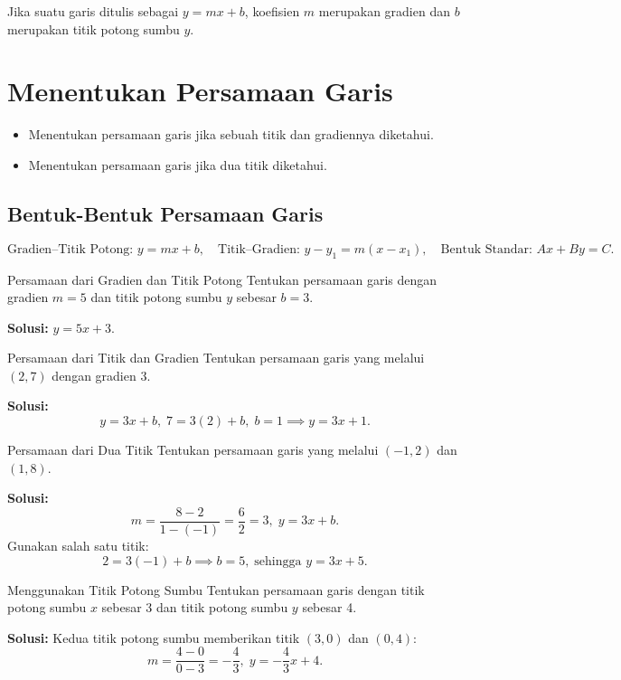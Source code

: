Jika suatu garis ditulis sebagai \(y=mx+b\), koefisien \(m\) merupakan gradien dan \(b\) merupakan titik potong sumbu $y$.

\section{Menentukan Persamaan Garis}
\begin{outcome}
\begin{itemize}
\item Menentukan persamaan garis jika sebuah titik dan gradiennya diketahui.
\item Menentukan persamaan garis jika dua titik diketahui.
\end{itemize}
\end{outcome}

\subsection*{Bentuk-Bentuk Persamaan Garis}
\[
\text{Gradien--Titik Potong: }y=mx+b,\quad \text{Titik--Gradien: }y-y_1=m(x-x_1),\quad \text{Bentuk Standar: }Ax+By=C.
\]

\begin{example}{Persamaan dari Gradien dan Titik Potong}\label{exa:eq-slope-int}
Tentukan persamaan garis dengan gradien \(m=5\) dan titik potong sumbu $y$ sebesar \(b=3\).

\textbf{Solusi:} \(y=5x+3.\)
\end{example}

\begin{example}{Persamaan dari Titik dan Gradien}\label{exa:eq-point-slope}
Tentukan persamaan garis yang melalui \((2,7)\) dengan gradien \(3\).

\textbf{Solusi:}
\[
y=3x+b,\; 7=3(2)+b,\; b=1 \implies y=3x+1.
\]
\end{example}

\begin{example}{Persamaan dari Dua Titik}\label{exa:eq-two-points}
Tentukan persamaan garis yang melalui \((-1,2)\) dan \((1,8)\).

\textbf{Solusi:}
\[
m=\frac{8-2}{1-(-1)}=\frac{6}{2}=3,\; y=3x+b.
\]
Gunakan salah satu titik:
\[
2=3(-1)+b \implies b=5,\; \text{sehingga } y=3x+5.
\]
\end{example}

\begin{example}{Menggunakan Titik Potong Sumbu}\label{exa:eq-from-intercepts}
Tentukan persamaan garis dengan titik potong sumbu $x$ sebesar 3 dan titik potong sumbu $y$ sebesar 4.

\textbf{Solusi:} Kedua titik potong sumbu memberikan titik $(3,0)$ dan $(0,4)$:
\[
m=\frac{4-0}{0-3}=-\frac{4}{3},\;y=-\frac{4}{3}x+4.
\]
\end{example}

